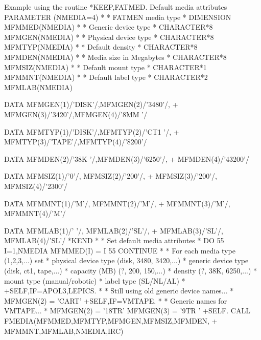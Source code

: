 \newpage
\begin{XMPt}{Example using the \protect{} routine}
*KEEP,FATMED. Default media attributes
      PARAMETER     (NMEDIA=4)
*
*     FATMEN media type
*
      DIMENSION     MFMMED(NMEDIA)
*
*     Generic device type
*
      CHARACTER*8   MFMGEN(NMEDIA)
*
*     Physical device type
*
      CHARACTER*8   MFMTYP(NMEDIA)
*
*     Default density
*
      CHARACTER*8   MFMDEN(NMEDIA)
*
*     Media size in Megabytes
*
      CHARACTER*8   MFMSIZ(NMEDIA)
*
*     Default mount type
*
      CHARACTER*1   MFMMNT(NMEDIA)
*
*     Default label type
*
      CHARACTER*2   MFMLAB(NMEDIA)

      DATA          MFMGEN(1)/'DISK'/,MFMGEN(2)/'3480'/,
     +              MFMGEN(3)/'3420'/,MFMGEN(4)/'8MM '/

      DATA          MFMTYP(1)/'DISK'/,MFMTYP(2)/'CT1 '/,
     +              MFMTYP(3)/'TAPE'/,MFMTYP(4)/'8200'/

      DATA          MFMDEN(2)/'38K '/,MFMDEN(3)/'6250'/,
     +              MFMDEN(4)/'43200'/

      DATA          MFMSIZ(1)/'0'/,   MFMSIZ(2)/'200'/,
     +              MFMSIZ(3)/'200'/, MFMSIZ(4)/'2300'/

      DATA          MFMMNT(1)/'M'/,   MFMMNT(2)/'M'/,
     +              MFMMNT(3)/'M'/,   MFMMNT(4)/'M'/

      DATA          MFMLAB(1)/'  '/,  MFMLAB(2)/'SL'/,
     +              MFMLAB(3)/'SL'/,  MFMLAB(4)/'SL'/
*KEND
*
*     Set default media attributes
*
      DO 55 I=1,NMEDIA
      MFMMED(I) = I
   55 CONTINUE
*
*     For each media type (1,2,3,...) set
*         physical device type (disk, 3480, 3420,...)
*         generic  device type (disk, ct1,  tape,...)
*         capacity (MB)        (?, 200, 150,...)
*         density              (?, 38K, 6250,...)
*         mount type           (manual/robotic)
*         label type           (SL/NL/AL)
*
+SELF,IF=APOL3,LEPICS.
*
*     Still using old generic device names...
*
      MFMGEN(2) = 'CART'
+SELF,IF=VMTAPE.
*
*     Generic names for VMTAPE...
*
      MFMGEN(2) = '18TR'
      MFMGEN(3) = '9TR '
+SELF.
      CALL FMEDIA(MFMMED,MFMTYP,MFMGEN,MFMSIZ,MFMDEN,
     +            MFMMNT,MFMLAB,NMEDIA,IRC)
\end{XMPt}
